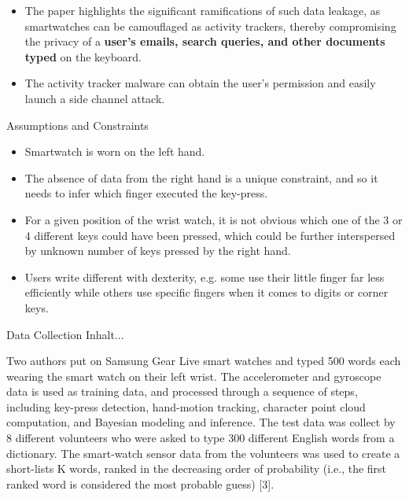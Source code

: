 \documentclass[ucs,9pt]{beamer}
\begin{document}
\begin{frame}
 \begin{itemize}
 	\item The paper highlights the significant ramifications
 	of such data leakage, as smartwatches can be camouflaged
 	as activity trackers, thereby compromising the privacy of a
 	\textbf{user’s emails, search queries, and other documents typed} on
 	the keyboard. 
 	
 	\item %
 	The activity tracker malware can obtain the	user’s permission and easily launch a side channel attack. 	
 \end{itemize}
\end{frame}

\begin{frame}{Assumptions and Constraints}
	\begin{itemize}
		\item Smartwatch is worn on the left hand.
		\item The absence of data from the right hand is a unique constraint, and so it needs to infer which finger	executed the key-press.
		\item For a given position of the wrist watch, it is not obvious which one of the 3 or 4 different keys could have been pressed, which could be further interspersed by unknown number of keys pressed by the right hand. 
		\item Users write different with dexterity, e.g. some use their little
		finger far less efficiently while others use specific fingers when
		it comes to digits or corner keys.
	\end{itemize}
\end{frame}

\begin{frame}{Data Collection}
	Inhalt...
	
		Two authors put on Samsung Gear Live
	smart watches and typed 500 words each wearing the smart
	watch on their left wrist. The accelerometer and gyroscope
	data is used as training data, and processed through a sequence
	of steps, including key-press detection, hand-motion tracking,
	character point cloud computation, and Bayesian modeling and
	inference. The test data was collect by 8 different volunteers
	who were asked to type 300 different English words from a
	dictionary. The smart-watch sensor data from the volunteers
	was used to create a short-lists K words, ranked in the
	decreasing order of probability (i.e., the first ranked word is
	considered the most probable guess) [3].
	
\end{frame}
\end{document}
